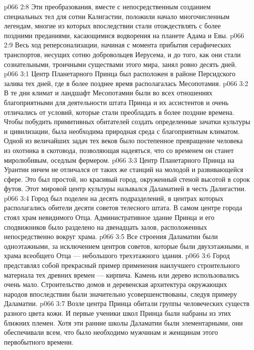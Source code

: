 \vs p066 2:8 \pc Эти преобразования, вместе с непосредственным созданием специальных тел для сотни Калигастии, положили начало многочисленным легендам, многие из которых впоследствии стали отождествлять с более поздними преданиями, касающимися водворения на планете Адама и Евы.
\vs p066 2:9 Весь ход реперсонализации, начиная с момента прибытия серафических транспортов, несущих сотню добровольцев Иерусема, и до того, как они стали сознательными, троичными существами этого мира, занял ровно десять дней.
\vs p066 3:1 Центр Планетарного Принца был расположен в районе Персидского залива тех дней, где в более позднее время располагалась Месопотамия.
\vs p066 3:2 В те дни климат и ландшафт Месопотамии были во всех отношениях благоприятными для деятельности штата Принца и их ассистентов и очень отличались от условий, которые стали преобладать в более поздние времена. Чтобы побудить примитивных обитателей создать определенные зачатки культуры и цивилизации, была необходима природная среда с благоприятным климатом. Одной из величайших задач тех веков было постепенное превращение человека из охотника в скотовода, позволяющая надеяться, что со временем он станет миролюбивым, оседлым фермером.
\vs p066 3:3 \pc Центр Планетарного Принца на Урантии ничем не отличался от таких же станций на молодой и развивающейся сфере. Это был простой, но красивый город, окруженный стеной высотой в сорок футов. Этот мировой центр культуры назывался Даламатией в честь Далигастии.
\vs p066 3:4 Город был поделен на десять подразделений, в центрах которых располагались обители десяти советов телесного штата. В самом центре города стоял храм невидимого Отца. Административное здание Принца и его сподвижников было разделено на двенадцать залов, расположенных непосредственно вокруг храма.
\vs p066 3:5 Все строения Даламатии были одноэтажными, за исключением центров советов, которые были двухэтажными, и храма всеобщего Отца --- небольшого трехэтажного здания.
\vs p066 3:6 Город представлял собой прекрасный пример применения наилучшего строительного материала тех древних времен --- кирпича. Камень или дерево использовались очень мало. Строительство домов и деревенская архитектура окружающих народов впоследствии были значительно усовершенствованы, следуя примеру Даламатии.
\vs p066 3:7 \pc Возле центра Принца обитали группы человеческих существ разного цвета кожи. И первые ученики школ Принца были набраны из этих ближних племен. Хотя эти ранние школы Даламатии были элементарными, они обеспечивали всем, что было необходимо мужчинам и женщинам этого первобытного времени.
